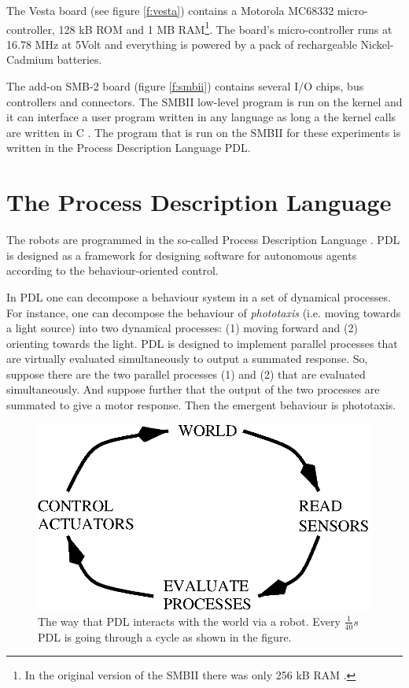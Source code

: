 The Vesta board (see figure \ref{f:vesta}) contains a Motorola MC68332 micro-controller, 128 kB ROM and 1 MB RAM\footnote{In the original version of the SMBII there was only 256 kB RAM \citep{vereertbrugghen:1996}.}. The board's micro-controller runs at 16.78 MHz at 5Volt and everything is powered by a pack of rechargeable Nickel-Cadmium batteries.

The add-on SMB-2 board (figure \ref{f:smbii}) contains several I/O chips, bus controllers and connectors. The SMBII low-level program is run on the kernel and it can interface a user program written in any language as long a the kernel calls are written in C  \citep{vereertbrugghen:1996}. The program that is run on the SMBII for these experiments is written in the Process Description Language PDL. 

\section{The Process Description Language}\label{s:robots:PDL}\label{s:robots:pdl}

The robots are programmed in the so-called Process Description Language \citep{steels:1992,steels:1994b,steels:1994a}. PDL is designed as a framework for designing software for autonomous agents according to the behaviour-oriented control. 

In PDL one can decompose a behaviour system in a set of dynamical processes. For instance, one can decompose the behaviour of {\em phototaxis} (i.e. moving towards a light source) into two dynamical processes: (1) moving forward and (2) orienting towards the light. PDL is designed to implement parallel processes that are virtually evaluated simultaneously to output a summated response. So, suppose there are the two parallel processes (1) and (2) that are evaluated  simultaneously. And suppose further that the output of the two processes are summated to give a motor response. Then the emergent behaviour is phototaxis. 

\begin{figure}
\centerline{\includegraphics[width=12cm]{robots//pdlcycle.eps}}
\caption{The way that PDL interacts with the world via a robot. Every $\frac{1}{40} s$ PDL is going through a cycle as shown in the figure.}
\label{f:pdlcycle}
\end{figure}

